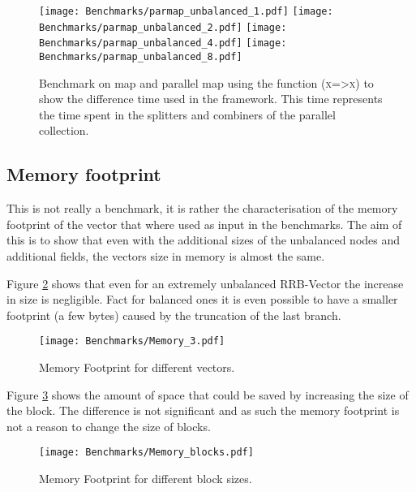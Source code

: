 \begin{figure}[h!]
  \centering
  \texttt{[image: Benchmarks/parmap\_unbalanced\_1.pdf]}
  \texttt{[image: Benchmarks/parmap\_unbalanced\_2.pdf]}
  \texttt{[image: Benchmarks/parmap\_unbalanced\_4.pdf]}
  \texttt{[image: Benchmarks/parmap\_unbalanced\_8.pdf]}
  \label{ParallelUnbalancedBenchmarks}
  \caption{Benchmark on map and parallel map using the function (\textsc{x=>x}) to show the difference time used in the framework. This time represents the time spent in the splitters and combiners of the parallel collection.}
\end{figure}

\FloatBarrier

\subsection{Memory footprint}
This is not really a benchmark, it is rather the characterisation of the memory footprint of the vector that where used as input in the benchmarks. The aim of this is to show that even with the additional sizes of the unbalanced nodes and additional fields, the vectors size in memory is almost the same.

Figure \ref{MemoryFootprints} shows that even for an extremely unbalanced RRB-Vector the increase in size is negligible. Fact for balanced ones it is even possible to have a smaller footprint (a few bytes) caused by the truncation of the last branch. 

\begin{figure}[h!]
  \centering
  \texttt{[image: Benchmarks/Memory\_3.pdf]}
  \caption{Memory Footprint for different vectors.}
  \label{MemoryFootprints}
\end{figure}

\FloatBarrier

Figure \ref{MemoryBlocksFootprints} shows the amount of space that could be saved by increasing the size of the block. The difference is not significant and as such the memory footprint is not a reason to change the size of blocks.

\begin{figure}[h!]
  \centering
  \texttt{[image: Benchmarks/Memory\_blocks.pdf]}
  \caption{Memory Footprint for different block sizes.}
  \label{MemoryBlocksFootprints}
\end{figure}

\FloatBarrier

